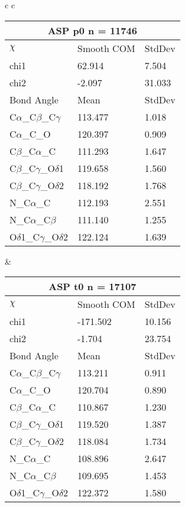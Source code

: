 \begin{longtable}{ c c }

  \begin{tabular}{ l l l }
  \toprule
  \multicolumn{3}{c}{ASP \textbf{p0} n = 11746} \\ \toprule
  $\chi$       & Smooth COM & StdDev \\ \midrule
  chi1 & 62.914 & 7.504 \\ 
  chi2 & -2.097 & 31.033 \\ \midrule
  Bond Angle   & Mean     & StdDev \\ \midrule
  C$\alpha$\_C$\beta$\_C$\gamma$ & 113.477 & 1.018\\
  C$\alpha$\_C\_O & 120.397 & 0.909\\
  C$\beta$\_C$\alpha$\_C & 111.293 & 1.647\\
  C$\beta$\_C$\gamma$\_O$\delta$1 & 119.658 & 1.560\\
  C$\beta$\_C$\gamma$\_O$\delta$2 & 118.192 & 1.768\\
  N\_C$\alpha$\_C & 112.193 & 2.551\\
  N\_C$\alpha$\_C$\beta$ & 111.140 & 1.255\\
  O$\delta$1\_C$\gamma$\_O$\delta$2 & 122.124 & 1.639\\
  \bottomrule
  \end{tabular}
  &
  \begin{tabular}{ l l l }
  \toprule
  \multicolumn{3}{c}{ASP \textbf{t0} n = 17107} \\ \toprule
  $\chi$       & Smooth COM & StdDev \\ \midrule
  chi1 & -171.502 & 10.156 \\ 
  chi2 & -1.704 & 23.754 \\ \midrule
  Bond Angle   & Mean     & StdDev \\ \midrule
  C$\alpha$\_C$\beta$\_C$\gamma$ & 113.211 & 0.911\\
  C$\alpha$\_C\_O & 120.704 & 0.890\\
  C$\beta$\_C$\alpha$\_C & 110.867 & 1.230\\
  C$\beta$\_C$\gamma$\_O$\delta$1 & 119.520 & 1.387\\
  C$\beta$\_C$\gamma$\_O$\delta$2 & 118.084 & 1.734\\
  N\_C$\alpha$\_C & 108.896 & 2.647\\
  N\_C$\alpha$\_C$\beta$ & 109.695 & 1.453\\
  O$\delta$1\_C$\gamma$\_O$\delta$2 & 122.372 & 1.580\\
  \bottomrule

\end{tabular}
\end{longtable}
